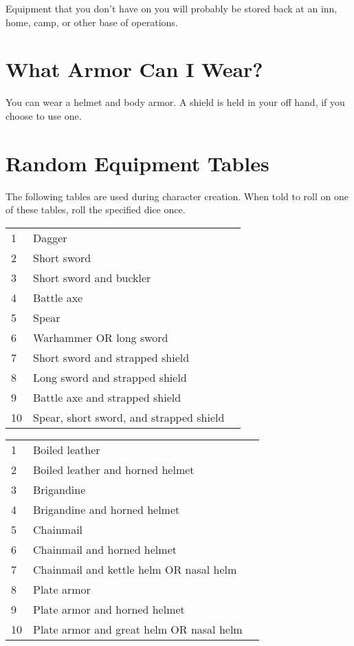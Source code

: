 Equipment that you don't have on you will probably be stored
back at an inn, home, camp, or other base of operations.

\section{What Armor Can I Wear?}

You can wear a helmet and body armor. A shield is held in your
off hand, if you choose to use one.

\section{Random Equipment Tables}

The following tables are used during character creation. When told
to roll on one of these tables, roll the specified dice once.

\begin{center}
{
\begin{xtabular}{|l|l|l|}
1 & Dagger \\
2 & Short sword \\
3 & Short sword and buckler \\
4 & Battle axe \\
5 & Spear \\
6 & Warhammer OR long sword \\
7 & Short sword and strapped shield \\
8 & Long sword and strapped shield \\
9 & Battle axe and strapped shield \\
10 & Spear, short sword, and strapped shield \\
\hline
\end{xtabular}
}
\end{center}

\begin{center}
{
\begin{xtabular}{|l|l|l|}
1 & Boiled leather \\
2 & Boiled leather and horned helmet \\
3 & Brigandine \\
4 & Brigandine and horned helmet \\
5 & Chainmail \\
6 & Chainmail and horned helmet \\
7 & Chainmail and kettle helm OR nasal helm \\
8 & Plate armor \\
9 & Plate armor and horned helmet \\
10 & Plate armor and great helm OR nasal helm \\
\hline
\end{xtabular}
}
\end{center}

